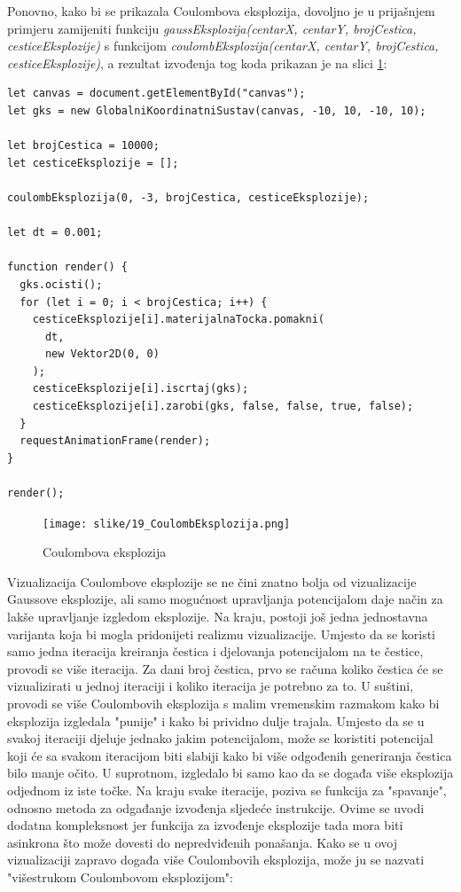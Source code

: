 \documentclass{foi}
\begin{document}
Ponovno, kako bi se prikazala Coulombova eksplozija, dovoljno je u prijašnjem primjeru zamijeniti funkciju \textit{gaussEksplozija(centarX, centarY, brojCestica, cesticeEksplozije)} s funkcijom \textit{coulombEksplozija(centarX, centarY, brojCestica, cesticeEksplozije)}, a rezultat izvođenja tog koda prikazan je na slici \ref{fig:CoulombEksplozija}:

\begin{verbatim}
let canvas = document.getElementById("canvas");
let gks = new GlobalniKoordinatniSustav(canvas, -10, 10, -10, 10);

let brojCestica = 10000;
let cesticeEksplozije = [];

coulombEksplozija(0, -3, brojCestica, cesticeEksplozije);

let dt = 0.001;

function render() {
  gks.ocisti();
  for (let i = 0; i < brojCestica; i++) {
    cesticeEksplozije[i].materijalnaTocka.pomakni(
      dt,
      new Vektor2D(0, 0)
    );
    cesticeEksplozije[i].iscrtaj(gks);
    cesticeEksplozije[i].zarobi(gks, false, false, true, false);
  }
  requestAnimationFrame(render);
}

render();
\end{verbatim}

\begin{figure}[H]
    \centering
    \texttt{[image: slike/19\_CoulombEksplozija.png]}
    \captionsetup{justification=centering}
    \caption{Coulombova eksplozija}
\label{fig:CoulombEksplozija}
\end{figure}

Vizualizacija Coulombove eksplozije se ne čini znatno bolja od vizualizacije Gaussove eksplozije, ali samo mogućnost upravljanja potencijalom daje način za lakše upravljanje izgledom eksplozije. Na kraju, postoji još jedna jednostavna varijanta koja bi mogla pridonijeti realizmu vizualizacije. Umjesto da se koristi samo jedna iteracija kreiranja čestica i djelovanja potencijalom na te čestice, provodi se više iteracija. Za dani broj čestica, prvo se računa koliko čestica će se vizualizirati u jednoj iteraciji i koliko iteracija je potrebno za to. U suštini, provodi se više Coulombovih eksplozija s malim vremenskim razmakom kako bi eksplozija izgledala "punije" i kako bi prividno dulje trajala. Umjesto da se u svakoj iteraciji djeluje jednako jakim potencijalom, može se koristiti potencijal koji će sa svakom iteracijom biti slabiji kako bi više odgođenih generiranja čestica bilo manje očito. U suprotnom, izgledalo bi samo kao da se događa više eksplozija odjednom iz iste točke. Na kraju svake iteracije, poziva se funkcija za "spavanje", odnosno metoda za odgađanje izvođenja sljedeće instrukcije. Ovime se uvodi dodatna kompleksnost jer funkcija za izvođenje eksplozije tada mora biti asinkrona što može dovesti do nepredviđenih ponašanja. Kako se u ovoj vizualizaciji zapravo događa više Coulombovih eksplozija, može ju se nazvati "višestrukom Coulombovom eksplozijom":
\end{document}
